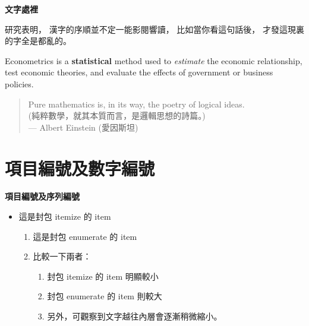 \documentclass[12pt, aspectratio=43]{beamer}
\begin{document}
\linespread{1}  %
\begin{frame}{\textbf{文字處裡}}
\linespread{1.5} %

	研究表明，
	漢字的序順並不定一能影閱響讀，
	比如當你看這句話後，
	才發這現裏的字全是都亂的。
	
	 \bigskip 
	 
	\pause 
	
	 \alert{Econometrics} is a \textbf{statistical} method used to \textit{estimate} the economic relationship,
	 test economic theories, and evaluate the effects of government or business policies.
	 
	 \pause
	
	\bigskip 

	\begin{quote}
		Pure mathematics is, in its way, the poetry of logical ideas.\\
		(純粹數學，就其本質而言，是邏輯思想的詩篇。)\\
		--- Albert Einstein (愛因斯坦)
	\end{quote}
	
\end{frame}


\section{項目編號及數字編號}


\linespread{1}  %
\begin{frame}[<+>]{\textbf{項目編號及序列編號}}
\linespread{1.5} %

	\begin{itemize}[] %
		\item 這是封包 itemize 的 item
		\begin{enumerate}[] %
			\item 這是封包 enumerate 的 item
			\item 比較一下兩者：
				\begin{enumerate}[1] %
					\item 封包 itemize 的 item 明顯較小
					\item 封包 enumerate 的 item 則較大
					\item 另外，可觀察到文字越往內層會逐漸稍微縮小。
				\end{enumerate}
		\end{enumerate}
	\end{itemize}
	
\end{frame}
\end{document}
